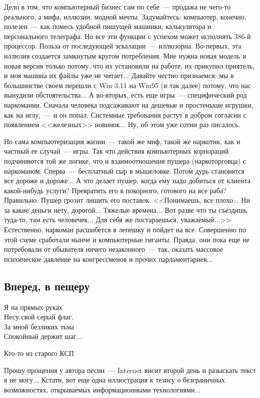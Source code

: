 \documentclass{scrbook}
\makeatletter
\newcommand{\defaultepigraphwidth}{0.5} %
\newcommand{\flqq}{<<}
\newcommand{\frqq}{>>}
\newcommand{\mdash}{~--- }
\newcommand{\commamdash}{~--- } %
\newcommand{\essaysection}[1]{\subsection*{#1}\nopagebreak}
\newcommand{\myepigraph}[3][\@empty]{
	\ifx\@empty#1
		\setlength{\epigraphwidth}{\defaultepigraphwidth\textwidth}
	\else
		\setlength{\epigraphwidth}{#1\textwidth}
	\fi
	\epigraph{#2}{#3}
	\setlength{\epigraphwidth}{\defaultepigraphwidth\textwidth} %
	\nopagebreak
}
\makeatother
\begin{document}
Дело в том, что компьютерный бизнес сам по себе{\mdash}продажа не чего-то реального, а мифа, иллюзии, модной мечты. Задумайтесь: компьютер, конечно, полезен{\mdash}как помесь удобной пишущей машинки, калькулятора и персонального телеграфа. Но все эти функции с успехом может исполнять 386-й процессор. Польза от последующей эскалации{\mdash}иллюзорна. Во-первых, эта иллюзия создается замкнутым кругом потребления. Мне нужна новая модель и новая версия только потому, что их установили на работе, их прикупил приятель, и моя машина их файлы уже не читает... Давайте честно признаемся: мы в большинстве своем перешли с Win 3.11 на Win95 (и так далее) потому, что нас вынудили обстоятельства... А во-вторых, есть еще игры{\mdash}специфический род наркомании. Сначала человека подсаживают на дешевые и простенькие игрушки, как на иглу,{\commamdash}и он попал. Системные требования растут в добром согласии с появлением {\flqq}железных{\frqq} новинок... Ну, об этом уже сотни раз писалось.

Но сама компьютеризация жизни{\mdash}такой же миф, такой же наркотик, как и частный ее случай{\mdash}игры. Так что действия компьютерных корпораций подчиняются той же логике, что и взаимоотношения пушера (наркоторговца) с наркоманом. Сперва{\mdash}бесплатный сыр в мышеловке. Потом дурь становится все дороже и дороже... А что делает пушер, когда ему надо добиться от клиента какой-нибудь услуги? Превратить его в покорного, готового на все раба? Правильно. Пушер грозит лишить его поставок. {\flqq}Понимаешь, все плохо... Ни за какие деньги нету, дорогой... Тяжелые времена... Вот разве что ты съездишь туда-то, там есть человечек... Для себя же постараешься, уважаемый...{\frqq} Естественно, наркоман расшибется в лепешку и пойдет на все. Совершенно по этой схеме сработали нынче и компьютерные гиганты. Правда, они пока еще не потребовали от обывателя ничего незаконного{\mdash}так, оказать массовое психическое давление на конгрессменов и прочих парламентариев...

\essaysection{Вперед, в пещеру}

\myepigraph{Я на прямых руках \\
Несу свой серый флаг. \\
За мной безликих тьма \\
Спокойный держит шаг...}
{Кто-то из старого КСП}

Прошу прощения у автора песни{\mdash}Internet висит второй день и разыскать текст я не могу... Кстати, вот еще одна иллюстрация к тезису о безграничных возможностях, открываемых информационными технологиями...
\end{document}
